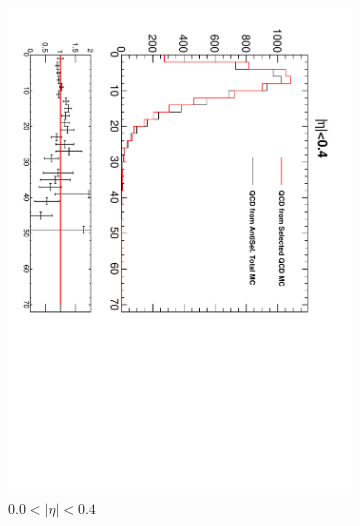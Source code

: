 \begin{figure}[htbp]
  \centering
  \begin{subfigure}{0.45\textwidth}
    \centering
    \includegraphics*[trim = 0mm 0mm 15mm 0mm, clip, width=\textwidth, angle=90]{MetCompare_anti_eta1.pdf}
    \caption{$0.0<| \eta |<0.4$}
    \label{fig:qcd_met_eta1}
  \end{subfigure}
  \begin{subfigure}{0.45\textwidth}
    \centering

\end{subfigure}
\end{figure}
